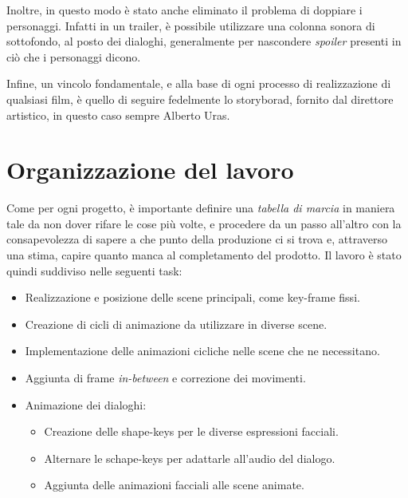 Inoltre, in questo modo è stato anche eliminato il problema di doppiare i personaggi. Infatti in un trailer, è possibile utilizzare una colonna sonora di sottofondo, al posto dei dialoghi, generalmente per nascondere \emph{spoiler} presenti in ciò che i personaggi dicono.

Infine, un vincolo fondamentale, e alla base di ogni processo di realizzazione di qualsiasi film, è quello di seguire fedelmente lo storyborad, fornito dal direttore artistico, in questo caso sempre Alberto Uras.

\newpage
\section{Organizzazione del lavoro}
Come per ogni progetto, è importante definire una \emph{tabella di marcia} in maniera tale da non dover rifare le cose più volte, e procedere da un passo all'altro con la consapevolezza di sapere a che punto della produzione ci si trova e, attraverso una stima, capire quanto manca al completamento del prodotto.
Il lavoro è stato quindi suddiviso nelle seguenti task:
\begin{itemize}
    \item Realizzazione e posizione delle scene principali, come key-frame fissi.
    \item Creazione di cicli di animazione da utilizzare in diverse scene.
    \item Implementazione delle animazioni cicliche nelle scene che ne necessitano.
    \item Aggiunta di frame \emph{in-between} e correzione dei movimenti.
    \item Animazione dei dialoghi:
    \begin{itemize}
        \item Creazione delle shape-keys per le diverse espressioni facciali.
        \item Alternare le schape-keys per adattarle all'audio del dialogo.
        \item Aggiunta delle animazioni facciali alle scene animate.
    \end{itemize}
\end{itemize}
